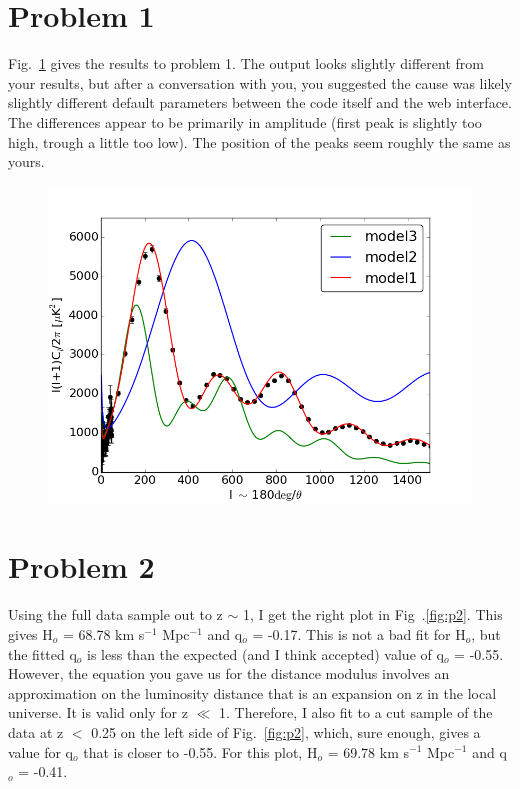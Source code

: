 \documentclass[12pt]{article}%
\begin{document}
\section{Problem 1}

Fig.~\ref{fig:p1} gives the results to problem 1. The output looks slightly different from your results, but after a conversation with you, you suggested the cause was likely slightly different default parameters between the code itself and the web interface. The differences appear to be primarily in amplitude (first peak is slightly too high, trough a little too low). The position of the peaks seem roughly the same as yours.

\begin{figure}[tb]
\center
\includegraphics[width=0.9\linewidth]{p1_.png}
\caption{}
\label{fig:p1}
\end{figure}

\section{Problem 2}

Using the full data sample out to z $\sim$ 1, I get the right plot in Fig~.\ref{fig:p2}. This gives H$_{o}$ = 68.78 km s$^{-1}$ Mpc$^{-1}$ and q$_{o}$ = -0.17. This is not a bad fit for H$_{o}$, but the fitted q$_{o}$ is less than the expected (and I think accepted) value of q$_{o}$ = -0.55. However, the equation you gave us for the distance modulus involves an approximation on the luminosity distance that is an expansion on z in the local universe. It is valid only for z $\ll$ 1. Therefore, I also fit to a cut sample of the data at z $<$ 0.25 on the left side of Fig.~\ref{fig:p2}, which, sure enough, gives a value for q$_o$ that is closer to -0.55. For this plot, H$_o$ = 69.78 km s$^{-1}$ Mpc$^{-1}$ and q$_{o}$ = -0.41.
\end{document}
